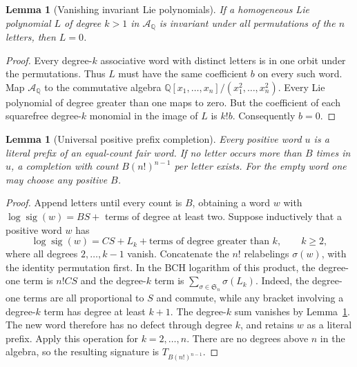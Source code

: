 \documentclass[11pt]{article}
\newtheorem{lemma}[theorem]{Lemma}
\newcommand{\A}{\mathcal A}
\begin{document}
\begin{lemma}[Vanishing invariant Lie polynomials]\label{invariant}
If a homogeneous Lie polynomial $L$ of degree $k>1$ in $\A_{\mathbb Q}$
is invariant under all permutations of the $n$ letters, then $L=0$.
\end{lemma}
\begin{proof}
Every degree-$k$ associative word with distinct letters is in one orbit
under the permutations. Thus $L$ must have the same coefficient $b$ on
every such word. Map $\A_{\mathbb Q}$ to the commutative algebra
$\mathbb Q[x_1,\ldots,x_n]/(x_1^2,\ldots,x_n^2)$. Every Lie polynomial
of degree greater than one maps to zero. But the coefficient of each
squarefree degree-$k$ monomial in the image of $L$ is $k!b$.
Consequently $b=0$.
\end{proof}

\begin{lemma}[Universal positive prefix completion]\label{completion}
Every positive word $u$ is a literal prefix of an equal-count fair word.
If no letter occurs more than $B$ times in $u$, a completion with count
$B(n!)^{n-1}$ per letter exists. For the empty word one may choose any
positive $B$.
\end{lemma}
\begin{proof}
Append letters until every count is $B$, obtaining a word $w$ with
$\log\operatorname{sig}(w)=BS+$ terms of degree at least two.
Suppose inductively that a positive word $w$ has
\[
 \log\operatorname{sig}(w)=C S+L_k+\text{terms of degree greater than }k,
 \qquad k\ge2,
\]
where all degrees $2,\ldots,k-1$ vanish. Concatenate the $n!$ relabelings
$\sigma(w)$, with the identity permutation first. In the BCH logarithm
of this product, the degree-one term is $n!CS$ and the degree-$k$ term
is $\sum_{\sigma\in\mathfrak S_n}\sigma(L_k)$. Indeed, the degree-one
terms are all proportional to $S$ and commute, while any bracket
involving a degree-$k$ term has degree at least $k+1$.
The degree-$k$ sum vanishes by Lemma~\ref{invariant}. The new word
therefore has no defect through degree $k$, and retains $w$ as a literal
prefix. Apply this operation for $k=2,\ldots,n$. There are no degrees
above $n$ in the algebra, so the resulting signature is
$T_{B(n!)^{n-1}}$.
\end{proof}
\end{document}
